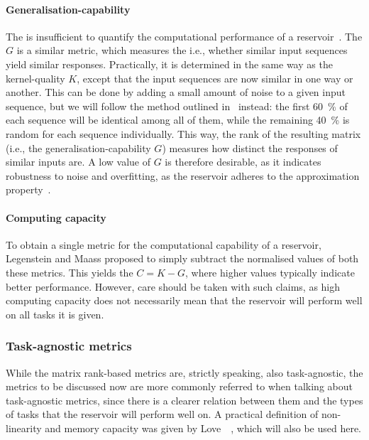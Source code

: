 \paragraph{Generalisation-capability}
The  is insufficient to quantify the computational performance of a reservoir~\cite{WhatMakesPowerful,RC_ASI,IL_Masterproef}.
The  $G$ is a similar metric, which measures the  i.e., whether similar input sequences yield similar responses.
Practically, it is determined in the same way as the kernel-quality $K$, except that the input sequences are now similar in one way or another.
This can be done by adding a small amount of noise to a given input sequence, but we will follow the method outlined in~\cite{RC_ASI} instead: the first \SI{60}{\percent} of each sequence will be identical among all of them, while the remaining \SI{40}{\percent} is random for each sequence individually.
This way, the rank of the resulting matrix (i.e., the generalisation-capability $G$) measures how distinct the responses of similar inputs are.
A low value of $G$ is therefore desirable, as it indicates robustness to noise and overfitting, as the reservoir adheres to the approximation property~\cite{RCbenchmarksReview1}.

\paragraph{Computing capacity}
To obtain a single metric for the computational capability of a reservoir, Legenstein and Maass proposed to simply subtract the normalised values of both these metrics.
This yields the  $C = K - G$, where higher values typically indicate better performance.
However, care should be taken with such claims, as high computing capacity does not necessarily mean that the reservoir will perform well on all tasks it is given.

\subsubsection{Task-agnostic metrics}
While the matrix rank-based metrics are, strictly speaking, also task-agnostic, the metrics to be discussed now are more commonly referred to when talking about task-agnostic metrics, since there is a clearer relation between them and the types of tasks that the reservoir will perform well on.
A practical definition of non-linearity and memory capacity was given by Love~\etal~\cite{RC_TaskAgnosticMetrics_v2}, which will also be used here.

